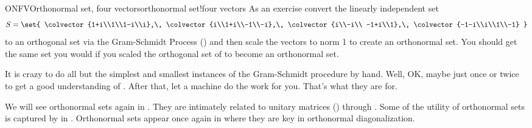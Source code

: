 \begin{example}{ONFV}{Orthonormal set, four vectors}{orthonormal set!four vectors}
As an exercise convert the linearly independent set
%
\begin{equation*}
S=\set{
\colvector{1+i\\1\\1-i\\i},\,
\colvector{i\\1+i\\-1\\-i},\,
\colvector{i\\-i\\ -1+i\\1},\,
\colvector{-1-i\\i\\1\\-1}
}
\end{equation*}
%
to an orthogonal set via the Gram-Schmidt Process () and then scale the vectors to norm 1 to create an orthonormal set.  You should get the same set you would if you scaled the orthogonal set of  to become an orthonormal set.
\end{example}
%
{It is crazy to do all but the simplest and smallest instances of the Gram-Schmidt procedure by hand.  Well, OK, maybe just once or twice to get a good understanding of .  After that, let a machine do the work for you.  That's what they are for.}
{
}{
}
\par
%
We will see orthonormal sets again in .   They are intimately related to unitary matrices () through .  Some of the utility of orthonormal sets is captured by  in .   Orthonormal sets appear once again in  where they are key in orthonormal diagonalization.
%


